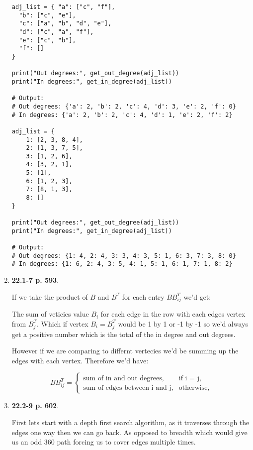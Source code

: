 \documentclass{article}
\begin{document}
\begin{enumerate}
    \begin{lstlisting}
adj_list = { "a": ["c", "f"],
  "b": ["c", "e"],
  "c": ["a", "b", "d", "e"],
  "d": ["c", "a", "f"],
  "e": ["c", "b"],
  "f": []
}

print("Out degrees:", get_out_degree(adj_list))
print("In degrees:", get_in_degree(adj_list))

# Output:
# Out degrees: {'a': 2, 'b': 2, 'c': 4, 'd': 3, 'e': 2, 'f': 0}
# In degrees: {'a': 2, 'b': 2, 'c': 4, 'd': 1, 'e': 2, 'f': 2}

adj_list = {
    1: [2, 3, 8, 4],
    2: [1, 3, 7, 5],
    3: [1, 2, 6],
    4: [3, 2, 1],
    5: [1],
    6: [1, 2, 3],
    7: [8, 1, 3],
    8: []
}

print("Out degrees:", get_out_degree(adj_list))
print("In degrees:", get_in_degree(adj_list))

# Output:
# Out degrees: {1: 4, 2: 4, 3: 3, 4: 3, 5: 1, 6: 3, 7: 3, 8: 0}
# In degrees: {1: 6, 2: 4, 3: 5, 4: 1, 5: 1, 6: 1, 7: 1, 8: 2}
    \end{lstlisting}

    \item \textbf{22.1-7 p. 593}.
    
    If we take the product of $B$ and $B^T$ for each entry $BB^{T}_{ij}$ we'd get:

    The sum of veticies value $B_i$ for each edge in the row with each edges vertex from $B^T_j$.
    Which if vertex $B_i = B^T_j$ would be 1 by 1 or -1 by -1 so we'd always get a positive number which is the total of the in degree and out degrees.

    However if we are comparing to differnt vertecies we'd be summing up the edges with each vertex. Therefore we'd have:

    \begin{equation}
      BB^T_{ij} =
      \begin{cases}
        \text{sum of in and out degrees,} & \text{if i = j,} \\
        \text{sum of edges between i and j,} & \text{otherwise,}
      \end{cases}
    \end{equation}

    \item \textbf{22.2-9 p. 602}.
    
    First lets start with a depth first search algorithm, as it traverses through the edges one way then we can go back. 
    As opposed to breadth which would give us an odd 360 path forcing us to cover edges multiple times.


\end{enumerate}
\end{document}
